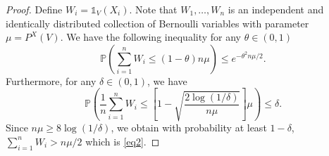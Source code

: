 \documentclass[paper=a4, fontsize=11pt]{scrartcl}
\newcommand{\ind}{\mathds{1}}
\newcommand{\PP}{\mathbb{P}}
\begin{document}
\begin{proof}

%
%
%



Define $W_i = \ind_{ V } (X_i) $. Note that $W_1,\ldots, W_n$ is an independent and identically distributed collection of Bernoulli variables with parameter $\mu = P^X (V)  $.
 We have the following inequality for any \( \theta \in (0,1) \)
\[
\PP \left(\sum_{i=1}^n W_i \leq (1 - \theta) n \mu  \right) \leq e^{-\theta^2 n \mu /2}.
\]  
Furthermore, for any \( \delta \in (0,1) \), we have  
\[
\PP  \left( \frac{1}{n} \sum_{i=1}^n W_i \leq \left[1 - \sqrt{\frac{2\log(1/\delta)}{ n  \mu }} \right]\mu  \right) \leq \delta.
\]  
Since $n\mu  \geq 8 \log(1/\delta)$, we obtain with probability at least $1-\delta$,
$ \sum_{i=1}^n W_i >  n \mu / 2$ which is \eqref{eq2}.
\end{proof}
\end{document}
